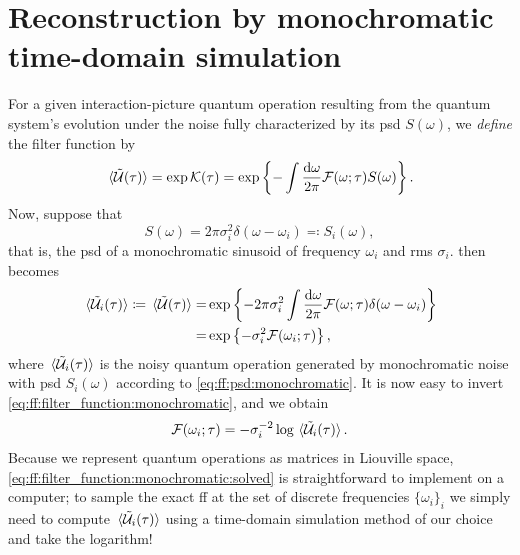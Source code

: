 \section{Reconstruction by monochromatic time-domain simulation}\label{sec:ff:validation:method}
For a given interaction-picture quantum operation \liouvUetavg resulting from the quantum system's evolution under the noise fully characterized by its \gls{psd} $S(\omega)$, we \emph{define} the filter function \FFot by
\begin{align}\label{eq:ff:filter_function:definition}
    \liouvUetavg = \exp\cumulantfun(\tau) = \exp\left\{-\int\frac{\dd{\omega}}{2\pi}\FFot S(\omega)\right\}.
\end{align}
Now, suppose that
\begin{equation}\label{eq:ff:psd:monochromatic}
    S(\omega) = 2\pi\sigma_i^2 \delta(\omega - \omega_i) \eqqcolon S_i(\omega),
\end{equation}
that is, the \gls{psd} of a monochromatic sinusoid of frequency $\omega_i$ and \gls{rms} $\sigma_i$.
 then becomes
\begin{align}
    \ev*{\liouvUe_i(\tau)} \coloneqq \liouvUetavg =& \exp\left\lbrace -2\pi\sigma_i^2\int\frac{\dd{\omega}}{2\pi}\FFot\delta(\omega - \omega_i)\right\rbrace \\
                                                  =& \exp\left\lbrace -\sigma_i^2\mc{F}(\omega_i;\tau)\right\rbrace, \label{eq:ff:filter_function:monochromatic}
\end{align}
where $\ev*{\liouvUe_i(\tau)}$ is the noisy quantum operation generated by monochromatic noise with \gls{psd} $S_i(\omega)$ according to \cref{eq:ff:psd:monochromatic}.
It is now easy to invert \cref{eq:ff:filter_function:monochromatic}, and we obtain
\begin{align}\label{eq:ff:filter_function:monochromatic:solved}
    \mc{F}(\omega_i; \tau) = -\sigma_i^{-2}\log\ev*{\liouvUe_i(\tau)}.
\end{align}
Because we represent quantum operations as matrices in Liouville space, \cref{eq:ff:filter_function:monochromatic:solved} is straightforward to implement on a computer; to sample the exact \gls{ff} at the set of discrete frequencies $\lbrace\omega_i\rbrace_i$ we simply need to compute $\ev*{\liouvUe_i(\tau)}$  using a time-domain simulation method of our choice and take the logarithm!

